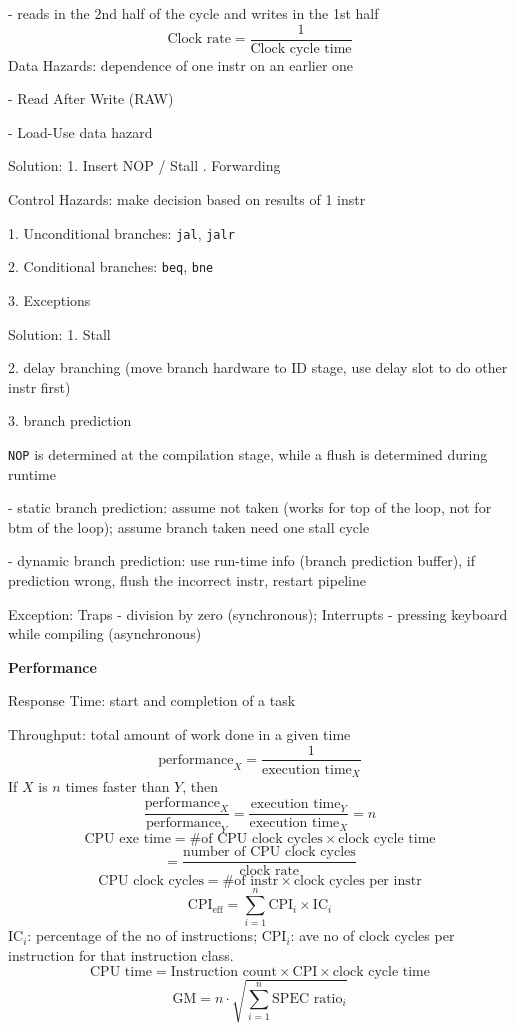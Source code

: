 \documentclass[10pt,landscape,a4paper]{article}
\begin{document}
\begin{multicols}{3}
- reads in the 2nd half of the cycle and writes in the 1st half
\[
  \text{Clock rate} = \frac{1}{\text{Clock cycle time}}
\]
Data Hazards: dependence of one instr on an earlier one

- Read After Write (RAW)

- Load-Use data hazard

Solution: 1. Insert NOP / Stall . Forwarding

Control Hazards: make decision based on results of 1 instr

1. Unconditional branches: \verb|jal|, \verb|jalr|

2. Conditional branches: \verb|beq|, \verb|bne|

3. Exceptions

Solution: 1. Stall

2. delay branching (move branch hardware to ID stage, use delay slot to do other instr first)

3. branch prediction

\verb|NOP| is determined at the compilation stage, while a flush is determined during runtime

- static branch prediction: assume not taken (works for top of the loop, not for btm of the loop); assume branch taken need one stall cycle

- dynamic branch prediction: use run-time info (branch prediction  buffer), if prediction wrong, flush the incorrect instr, restart pipeline

Exception: Traps - division by zero (synchronous); Interrupts - pressing keyboard while compiling (asynchronous)

\textbf{Performance} 

Response Time: start and completion of a task

Throughput: total amount of work done in a given time
\[
  \text{performance}_X = \frac{1}{\text{execution time}_X}
\]
If \(X\) is \(n\) times faster than \(Y\), then
\[
  \frac{\text{performance}_X}{\text{performance}_Y} = \frac{\text{execution time}_Y}{\text{execution time}_X} = n
\]
\[
  \text{CPU exe time} = \text{\# of CPU clock cycles} \times \text{clock cycle time}
\]
\[
  = \dfrac{\text{number of CPU clock cycles}}{\text{clock rate}}
\]
\[
  \text{CPU clock cycles} = \text{\# of instr} \times \text{clock cycles per instr}
\]
\[
  \text{CPI}_{\text{eff}} = \sum_{i = 1}^n \text{CPI}_i \times \text{IC}_i
\]
\(\text{IC}_i\): percentage of the no of instructions; \(\text{CPI}_i\): ave no of clock cycles per instruction for that instruction class.
\[
  \text{CPU time} = \text{Instruction count} \times \text{CPI} \times \text{clock cycle time}
\]
\[
  \text{GM} = n \cdot \sqrt{\sum_{i = 1}^n \text{SPEC ratio}_i} 
\]


\end{multicols}
\end{document}

